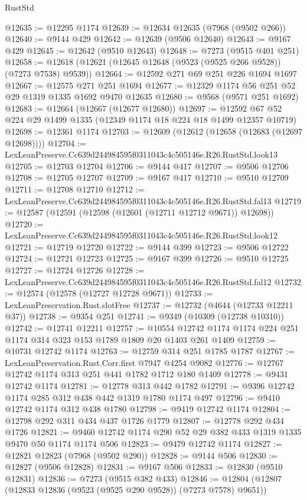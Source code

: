 \begin{lexlean}{RustStd}
\begin{coremodule}
@12635 := @12295 @1174
@12639 := @12634 @12635 (@7968 (@9502 @266))
@12640 := @9144 @429
@12642 := @12639 (@9506 @12640)
@12643 := @9167 @429
@12645 := @12642 (@9510 @12643)
@12648 := @7273 (@9515 @401 @251)
@12658 := @12618 (@12621 (@12645 @12648 (@9523 (@9525 @266 @9528)) (@7273 @7538) @9539))
@12664 := @12592 @271 @69 @251 @226 @1694 @1697
@12667 := @12575 @271 @251 @1694
@12677 := @12329 @1174 @56 @251 @52 @29 @1319 @1335 @1692 @9470 @12635
@12680 := @9568 (@9571 @251 @1692)
@12683 := @12664 (@12667 (@12677 @12680))
@12697 := @12592 @67 @52 @224 @29 @1499 @1335 (@12349 @1174 @18 @224 @18 @1499 @12357 @10719)
@12698 := @12361 @1174
@12703 := @12609 (@12612 (@12658 (@12683 (@12697 @12698))))
@12704 := LexLeanPreserve.Cc639d244984595f0311043c4c505146e.R26.RustStd.look13
@12705 := @12703 @12704
@12706 := @9144 @417
@12707 := @9506 @12706
@12708 := @12705 @12707
@12709 := @9167 @417
@12710 := @9510 @12709
@12711 := @12708 @12710
@12712 := LexLeanPreserve.Cc639d244984595f0311043c4c505146e.R26.RustStd.fal13
@12719 := @12587 (@12591 (@12598 (@12601 (@12711 @12712 @9671)) @12698))
@12720 := LexLeanPreserve.Cc639d244984595f0311043c4c505146e.R26.RustStd.look12
@12721 := @12719 @12720
@12722 := @9144 @399
@12723 := @9506 @12722
@12724 := @12721 @12723
@12725 := @9167 @399
@12726 := @9510 @12725
@12727 := @12724 @12726
@12728 := LexLeanPreserve.Cc639d244984595f0311043c4c505146e.R26.RustStd.fal12
@12732 := @12574 (@12578 (@12727 @12728 @9671))
@12733 := LexLeanPreservation.Rust.slotFree
@12737 := @12732 (@4644 (@12733 @12211 @37))
@12738 := @9354 @251
@12741 := @9349 (@10309 (@12738 @10310))
@12742 := @12741 @12211
@12757 := @10554 @12742 @1174 @1174 @224 @251 @1174 @314 @323 @153 @1789 @1809 @20 @1403 @261 @1409
@12759 := @10731 @12742 @1174
@12763 := @12759 @314 @251 @1785 @1787
@12767 := LexLeanPreservation.Rust.Corr.first @7947 @4254 @9082
@12776 := @12767 @12742 @1174 @313 @251 @441 @1782 @1712 @180 @1409
@12778 := @9431 @12742 @1174
@12781 := @12778 @313 @442 @1782
@12791 := @9396 @12742 @1174 @285 @312 @438 @442 @1319 @1780 @1174 @497
@12796 := @9410 @12742 @1174 @312 @438 @1780
@12798 := @9419 @12742 @1174
@12804 := @12798 @292 @311 @434 @437 @1726 @1779
@12807 := @12778 @292 @434 @1726
@12821 := @9460 @12742 @1174 @290 @52 @29 @382 @433 @1319 @1335 @9470 @50 @1174 @1174 @506
@12823 := @9479 @12742 @1174
@12827 := @12821 @12823 (@7968 (@9502 @290))
@12828 := @9144 @506
@12830 := @12827 (@9506 @12828)
@12831 := @9167 @506
@12833 := @12830 (@9510 @12831)
@12836 := @7273 (@9515 @382 @433)
@12846 := @12804 (@12807 (@12833 @12836 (@9523 (@9525 @290 @9528)) (@7273 @7578) @9651))

\end{coremodule}
\end{lexlean}
